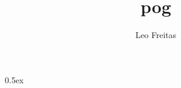 \documentclass[11pt,a4paper]{article}
\begin{document}
\title{pog}
\author{Leo Freitas}
\maketitle

\tableofcontents

\parindent 0pt\parskip 0.5ex



%
%
\end{document}
